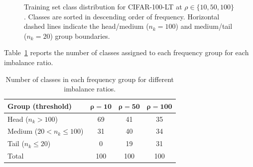 \documentclass[12pt,a4paper]{article}
\begin{document}
\begin{figure}[H]
    \caption{Training set class distribution for CIFAR-100-LT at $\rho \in \{10, 50, 100\}$. Classes are sorted in descending order of frequency. Horizontal dashed lines indicate the head/medium ($n_k = 100$) and medium/tail ($n_k = 20$) group boundaries.}
    \label{fig:class_dist}
\end{figure}

Table~\ref{tab:group_counts} reports the number of classes assigned to each frequency group for each imbalance ratio.

\begin{table}[H]
    \centering
    \caption{Number of classes in each frequency group for different imbalance ratios.}
    \label{tab:group_counts}
    \begin{tabular}{lccc}
        \toprule
        \textbf{Group (threshold)} & $\boldsymbol{\rho = 10}$ & $\boldsymbol{\rho = 50}$ & $\boldsymbol{\rho = 100}$ \\
        \midrule
        Head ($n_k > 100$)       & 69 & 41 & 35 \\
        Medium ($20 < n_k \leq 100$) & 31 & 40 & 34 \\
        Tail ($n_k \leq 20$)    & 0  & 19 & 31 \\
        \midrule
        Total                    & 100 & 100 & 100 \\
        \bottomrule
    \end{tabular}
\end{table}
\end{document}
